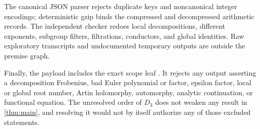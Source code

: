 The canonical JSON parser rejects duplicate keys and noncanonical integer
encodings; deterministic gzip binds the compressed and decompressed
arithmetic records.  The independent checker redoes local decompositions,
different exponents, subgroup filters, filtrations, conductors, and global
identities.  Raw exploratory transcripts and undocumented temporary outputs
are outside the premise graph.

Finally, the payload includes the exact scope leaf
\NoEuler.  It rejects any output asserting a decomposition Frobenius, bad
Euler polynomial or factor, epsilon factor, local or global root number,
Artin holomorphy, automorphy, analytic continuation, or functional equation.
The unresolved order of $D_3$ does not weaken any result in
\cref{thm:main}, and resolving it would not by itself authorize any of those
excluded statements.
